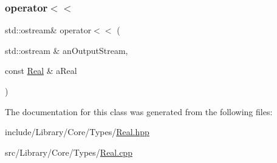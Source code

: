 \mbox{\label{classlibrary_1_1core_1_1types_1_1Real_a36816b0e006fd2ec3b0c53406439c7c3}} 
\subsubsection{\texorpdfstring{operator$<$$<$}{operator<<}}
{\footnotesize\ttfamily std\+::ostream\& operator$<$$<$ (\begin{DoxyParamCaption}\item[{std\+::ostream \&}]{an\+Output\+Stream,  }\item[{const \hyperlink{classlibrary_1_1core_1_1types_1_1Real}{Real} \&}]{a\+Real }\end{DoxyParamCaption})\hspace{0.3cm}{\ttfamily [friend]}}



The documentation for this class was generated from the following files\+:\begin{DoxyCompactItemize}
\item 
include/\+Library/\+Core/\+Types/\hyperlink{Real_8hpp}{Real.\+hpp}\item 
src/\+Library/\+Core/\+Types/\hyperlink{Real_8cpp}{Real.\+cpp}\end{DoxyCompactItemize}
